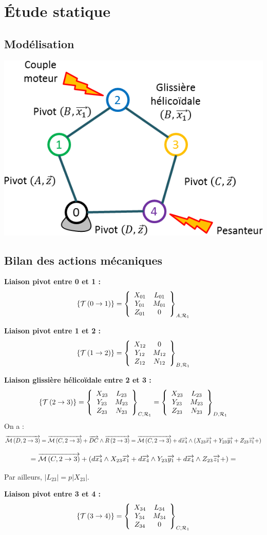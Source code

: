 \documentclass[10pt,fleqn]{article} %
\begin{document}
\section{Étude statique}
\subsection{Modélisation}
\begin{center}
\includegraphics[width=.45\textwidth]{images/graphe_structure}
\end{center}

\subsection{Bilan des actions mécaniques}

\textbf{Liaison pivot entre 0 et 1 :}
$$
\torseurstat{T}{0}{1}=\torseurcol{X_{01}}{Y_{01}}{Z_{01}}{L_{01}}{M_{01}}{0}{A,\mathcal{R}_1}
$$

\textbf{Liaison pivot entre 1 et 2 :}
$$
\torseurstat{T}{1}{2}=\torseurcol{X_{12}}{Y_{12}}{Z_{12}}{0}{M_{12}}{N_{12}}{B,\mathcal{R}_1}
$$

\textbf{Liaison glissière hélicoïdale entre 2 et 3 :}
$$
\torseurstat{T}{2}{3}
=\torseurcol{X_{23}}{Y_{23}}{Z_{23}}{L_{23}}{M_{23}}{N_{23}}{C,\mathcal{R}_1}
=\torseurcol{X_{23}}{Y_{23}}{Z_{23}}{L_{23}}{M_{23}}{N_{23}}{D,\mathcal{R}_1}
$$
On a :
$$
\vectm{D}{2}{3}
 = \vectm{C}{2}{3} + \vect{DC} \wedge \vectf{2}{3}
  = \vectm{C}{2}{3} + d\vect{x_4} \wedge \left( X_{23} \vect{x_1} +Y_{23} \vect{y_1} +Z_{23} \vect{z_1} + \right)
  $$
  
  $$
  = \vectm{C}{2}{3} +  \left(d\vect{x_4} \wedge X_{23} \vect{x_1} +d\vect{x_4} \wedge Y_{23} \vect{y_1} +d\vect{x_4} \wedge Z_{23} \vect{z_1} + \right)
  = 
  $$

Par ailleurs, $|L_{23}|=p|X_{23}|$.



\textbf{Liaison pivot entre 3 et 4 :}
$$
\torseurstat{T}{3}{4}=\torseurcol{X_{34}}{Y_{34}}{Z_{34}}{L_{34}}{M_{34}}{0}{C,\mathcal{R}_1}
$$
\end{document}
